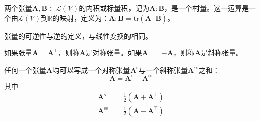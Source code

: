 \documentclass[main.tex]{subfiles}
\begin{document}
\begin{definition}[两个张量的标量积]
两个张量$\mathbf{A},\mathbf{B}\in\mathcal{L}\left(\mathcal{V}\right)$的内积或标量积，记为$\mathbf{A}:\mathbf{B}$，是一个村量。这一运算是一个由$\mathcal{L}\left(\mathcal{V}\right)$到$\mathbb{R}$的映射，定义为：$\mathbf{A}:\mathbf{B}=\mathrm{tr}\left(\mathbf{A}^\intercal\mathbf{B}\right)$。
\end{definition}

\begin{definition}[张量的逆]
张量的可逆性与逆的定义，与线性变换的相同。
\end{definition}

\begin{definition}[对称张量与斜称张量]
如果张量$\mathbf{A}=\mathbf{A}^\intercal$，则称$\mathbf{A}$是对称张量。如果$\mathbf{A}^\intercal=-\mathbf{A}$，则称$\mathbf{A}$是斜称张量。
\end{definition}

\begin{theorem}
任何一个张量$\mathbf{A}$均可以写成一个对称张量$\mathbf{A}^\mathrm{s}$与一个斜称张量$\mathbf{A}^\mathrm{ss}$之和：
\[\mathbf{A}=\mathbf{A}^\mathrm{s}+\mathbf{A}^\mathrm{ss}\]
其中
\[\begin{split}\mathbf{A}^\mathrm{s}&=\frac{1}{2}\left(\mathbf{A}+\mathbf{A}^\intercal\right)\\\mathbf{A}^\mathrm{ss}&=\frac{1}{2}\left(\mathbf{A}-\mathbf{A}^\intercal\right)\end{split}\]
\end{theorem}
\end{document}

